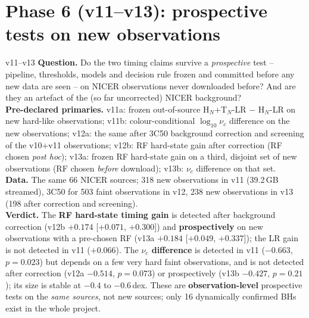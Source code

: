 \chapter{Phase 6 (v11--v13): prospective tests on new observations}\label{ch:phase6}

\begin{glance}{v11--v13}
\textbf{Question.} Do the two timing claims survive a \emph{prospective} test -- pipeline, thresholds, models and decision rule
frozen and committed before any new data are seen -- on NICER observations never downloaded before? And are they an artefact of
the (so far uncorrected) NICER background? \\
\textbf{Pre-declared primaries.} v11a: frozen out-of-source H$_N$+T$_N$-LR $-$ H$_N$-LR on new hard-like observations; v11b:
colour-conditional $\log_{10}\nu_c$ difference on the new observations; v12a: the same after 3C50 background correction and
screening of the v10+v11 observations; v12b: RF hard-state gain after correction (RF chosen \emph{post hoc}); v13a: frozen RF
hard-state gain on a third, disjoint set of new observations (RF chosen \emph{before} download); v13b: $\nu_c$ difference on that set. \\
\textbf{Data.} The same 66 NICER sources; 318 new observations in v11 (39.2\,GB streamed), 3C50 for 503 faint observations in v12,
238 new observations in v13 (198 after correction and screening). \\
\textbf{Verdict.} The \textbf{RF hard-state timing gain} is detected after background correction (v12b $+0.174$ [$+0.071$, $+0.300]$) and
\textbf{prospectively} on new observations with a pre-chosen RF (v13a $+0.184$ [$+0.049$, $+0.337$]); the LR gain is not detected in v11
($+0.066$). The \textbf{$\nu_c$ difference} is detected in v11 ($-0.663$, $p=0.023$) but depends on a few very hard faint observations,
and is not detected after correction (v12a $-0.514$, $p=0.073$) or prospectively (v13b $-0.427$, $p=0.21$); its size is stable at
$-0.4$ to $-0.6$\,dex. These are \textbf{observation-level} prospective tests on the \emph{same sources}, not new sources; only 16
dynamically confirmed BHs exist in the whole project.
\end{glance}

